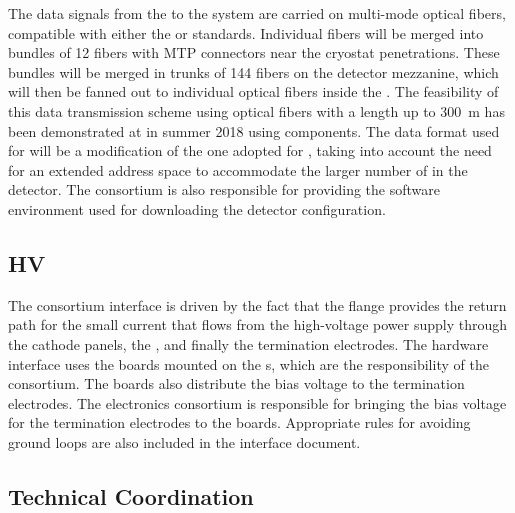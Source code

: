 The data signals from the  to the  system are carried on
multi-mode optical fibers, compatible with either the  or  standards. Individual
fibers will be merged into bundles of 12 fibers with MTP connectors near the 
 cryostat penetrations. These bundles will be merged in trunks of 144 
fibers on the detector mezzanine, which will then be fanned out to individual
optical fibers inside the . The
feasibility of this data transmission scheme using optical fibers with a length up
to \SI{300}{m} has been demonstrated at  in summer 2018 using 
 components. The data format used for 
 will be a modification of the one adopted for
, taking into account the need for an 
extended address space to accommodate the larger number of
 in the detector. The  consortium
is also responsible for providing the software environment
used for downloading the detector configuration.

\subsection{HV}
\label{sec:fdsp-tpcelec-interfaces-hv}

The  consortium interface 
is driven by the fact that the  flange provides the return path for
the small current that flows from the high-voltage power 
supply through the cathode panels, the , and finally
the termination electrodes. The hardware interface uses
the  boards mounted on the s, which
are  the responsibility of the  consortium. The
 boards also distribute the bias voltage to the 
 termination electrodes. The  electronics 
consortium is responsible for bringing the bias voltage for the 
 termination electrodes to the  boards. Appropriate
rules for avoiding ground loops are also included in the 
interface document.

\subsection{Technical Coordination}
\label{sec:fdsp-tpcelec-interfaces-tc}

